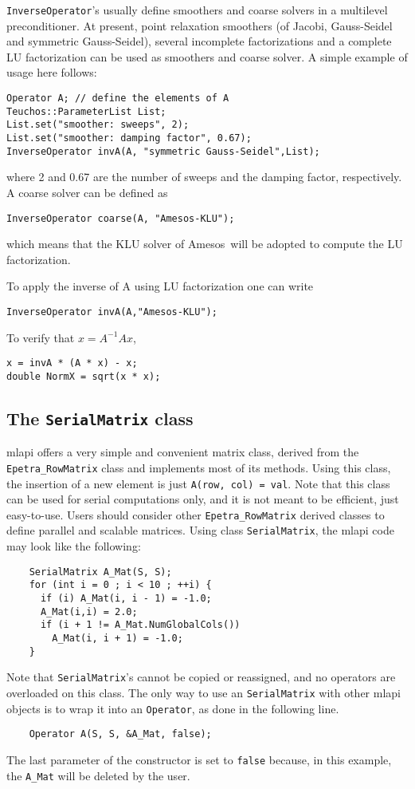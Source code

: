 \documentclass{article}[11pt]
\newcommand{\amesos}  {{\sc Amesos}}
\newcommand{\MLAPI}  {{\sc mlapi }}
\begin{document}
{\tt InverseOperator}'s usually define smoothers and coarse solvers in a
multilevel preconditioner. At present, point relaxation smoothers (of Jacobi,
Gauss-Seidel and symmetric Gauss-Seidel), several incomplete factorizations
and a complete LU factorization can be used as smoothers and coarse solver. A
simple example of usage here follows:
\begin{verbatim}
Operator A; // define the elements of A
Teuchos::ParameterList List;
List.set("smoother: sweeps", 2); 
List.set("smoother: damping factor", 0.67);
InverseOperator invA(A, "symmetric Gauss-Seidel",List);
\end{verbatim}
where 2 and 0.67 are the number of sweeps and the damping factor,
  respectively. A coarse solver can be defined as
\begin{verbatim}
InverseOperator coarse(A, "Amesos-KLU");
\end{verbatim}
which means that the KLU solver of \amesos\ will be adopted to compute the LU
factorization.

To apply the inverse of A using LU factorization one can write
\begin{verbatim}
InverseOperator invA(A,"Amesos-KLU");
\end{verbatim}
To verify that $x = A^{-1} A x$,
\begin{verbatim}
x = invA * (A * x) - x;
double NormX = sqrt(x * x);
\end{verbatim}

\subsection{The {\tt SerialMatrix} class}
\label{sec:serialmatrix}

\MLAPI offers a very simple and convenient matrix class, derived from
 the \verb!Epetra_RowMatrix! class and implements most of its methods. 
 Using this class, the insertion of a new
 element is just \verb!A(row, col) = val!. Note that this class
can be used for serial computations only, and it is not meant to be efficient,
just easy-to-use. Users should consider
other \verb!Epetra_RowMatrix! derived classes
to define parallel and scalable matrices. Using class {\tt SerialMatrix}, the \MLAPI
code may look like the following:
\begin{verbatim}
    SerialMatrix A_Mat(S, S);
    for (int i = 0 ; i < 10 ; ++i) {
      if (i) A_Mat(i, i - 1) = -1.0;
      A_Mat(i,i) = 2.0;
      if (i + 1 != A_Mat.NumGlobalCols())
        A_Mat(i, i + 1) = -1.0;
    }
\end{verbatim}
Note that {\tt SerialMatrix}'s cannot be copied or reassigned, and no
operators are overloaded on this class. The only way to use an
{\tt SerialMatrix} with other \MLAPI objects is to wrap it into an
{\tt Operator}, as done in the following line.
\begin{verbatim}
    Operator A(S, S, &A_Mat, false);
\end{verbatim}
The last parameter of the constructor is set to {\tt false} because, in
this example, the
\verb!A_Mat! will be deleted by the user.
\end{document}
